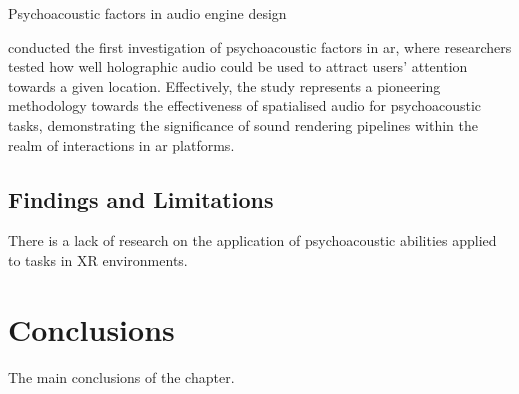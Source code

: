 \cite{hacihabiboglu2017perceptual} Psychoacoustic factors in audio engine design

\cite{holographic_localisation} conducted the first investigation of psychoacoustic factors in \acrshort{ar}, where researchers tested how well holographic audio could be used to attract users' attention towards a given location. Effectively, the study represents a pioneering methodology towards the effectiveness of spatialised audio for psychoacoustic tasks, demonstrating the significance of sound rendering pipelines within the realm of interactions in \acrshort{ar} platforms.\par

\subsection{Findings and Limitations}
There is a lack of research on the application of psychoacoustic abilities applied to tasks in XR environments.

\section{Conclusions}

The main conclusions of the chapter.
